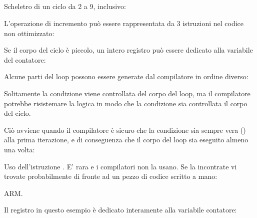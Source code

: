 \subsection{\Conclusion{}}

Scheletro di un ciclo da 2 a 9, inclusivo:



L'operazione di incremento può essere rappresentata da 3 istruzioni nel codice non ottimizzato:



Se il corpo del ciclo è piccolo, un intero registro può essere dedicato alla variabile del contatore:



Alcune parti del loop possono essere generate dal compilatore in ordine diverso:



Solitamente la condizione viene controllata   del corpo del loop, ma il compilatore potrebbe 
risistemare la logica in modo che la condizione sia controllata  il corpo del ciclo.

Ciò avviene quando il compilatore è sicuro che la condizione sia sempre vera () alla prima iterazione,
e di conseguenza che il corpo del loop sia eseguito almeno una volta:




Uso dell'istruzione . E' rara e i compilatori non la usano. Se la incontrate vi trovate probabilmente di fronte ad
un pezzo di codice scritto a mano:



ARM. 

Il registro  in questo esempio è dedicato interamente alla variabile contatore:




